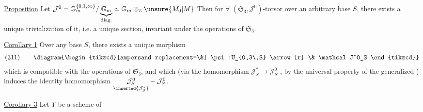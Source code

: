 


\uline{Proposition} Let 
$\mathcal J^0=\mathbb G_m^{\{0,1,\infty\}}/\underbrace{\mathbb G_m}_{\mathrm{diag.}}\simeq\mathbb G_m\otimes_{\mathbb Z}\unsure{M_0|M}$
Then for $\forall$ $(\mathfrak S_3,\mathcal J^0)$-torsor over an arbitrary base $S$, there exists a unique trivialization of it, i.e. a unique section, invariant under the operations of $\mathfrak S_3$.

\uline{Corollary 1} Over any base $S$, there exists a unique morphism
\[
(311)\qquad
\diagram{\begin{tikzcd}[ampersand replacement=\&]
\psi:U_{0,3\,S} \arrow[r] \& \mathcal J^0_S
\end{tikzcd}}
\]
which is compatible with the operations of $\mathfrak S_3$, and which (via the homomorphism
$\mathcal J^*_S\longrightarrow\mathcal J^0_S$   , by the universal property of the  generalized ) induces the identity homomorphism
$\underset{\inserted{\mathcal J^*_S}}{\mathcal J^0_S}-\mathcal J^0_S$.


\uline{Corollary 3} Let $Y$ be a scheme of




